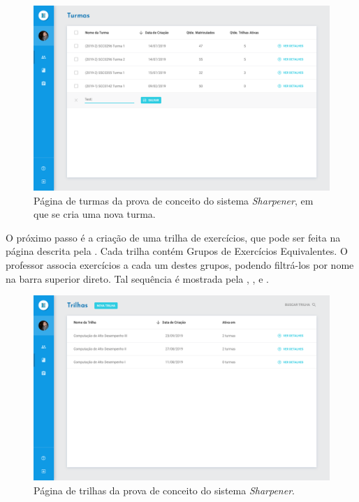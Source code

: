     \begin{figure}[htpb]
    \centering
    \includegraphics[width=\linewidth]{images/mocks/turmaNova.png}
    \caption{Página de turmas da prova de conceito do sistema \emph{Sharpener}, em que se 
    cria uma nova turma.}%
    \label{fig:turmasAdd}
  \end{figure}

O próximo passo é a criação de uma trilha de exercícios, que pode ser feita na página descrita pela . Cada trilha
contém Grupos de Exercícios Equivalentes. O professor associa exercícios 
a cada um destes grupos, podendo filtrá-los por nome na barra superior direto. 
Tal sequência é mostrada pela , ,  e .  

  \begin{figure}[htb]
  \centering
  \includegraphics[width=\linewidth]{images/mocks/track.png}
  \caption{Página de trilhas da prova de conceito do sistema \emph{Sharpener}.}%
  \label{fig:track}
  \end{figure}
  
